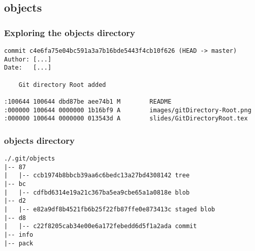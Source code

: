 \subsection{objects}
\begin{frame}[fragile]
    \frametitle{Exploring the objects directory}
    \lstset{
        language=bash,
        showstringspaces=true,
        frame=single,
        style=BashInputStyle
    }
    \begin{lstlisting}[caption={git log --raw -n1}, label={fig:lograw}]
commit c4e6fa75e04bc591a3a7b16bde5443f4cb10f626 (HEAD -> master)
Author: [...]
Date:   [...]

    Git directory Root added

:100644 100644 dbd87be aee74b1 M        README
:000000 100644 0000000 1b16bf9 A        images/gitDirectory-Root.png
:000000 100644 0000000 013543d A        slides/GitDirectoryRoot.tex
    \end{lstlisting}
\end{frame}

\begin{frame}[fragile]
    \frametitle{objects directory}
    \lstset{
        language=bash,
        showstringspaces=true,
        frame=single,
        style=BashInputStyle
    }
    \begin{lstlisting}[caption={[Tree]tree .git/objects example (shortened with comments)},label={fig:objectsdirectory}]
./.git/objects
|-- 87
|   |-- ccb1974b8bbcb39aa6c6bedc13a27bd4308142 tree
|-- bc
|   |-- cdfbd6314e19a21c367ba5ea9cbe65a1a0818e blob
|-- d2
|   |-- e82a9df8b4521fb6b25f22fb87ffe0e873413c staged blob
|-- d8
|   |-- c22f8205cab34e00e6a172febedd6d5f1a2ada commit
|-- info
|-- pack
    \end{lstlisting}
\end{frame}

